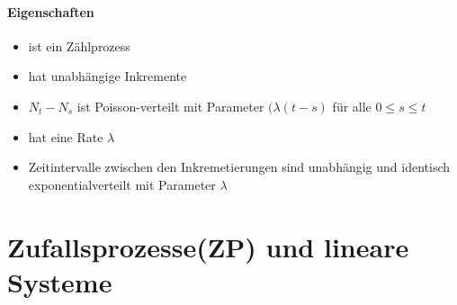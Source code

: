 \documentclass[6pt,a4paper]{scrartcl}
\begin{document}
\begin{multicols*}{4}
{	\paragraph{Eigenschaften}
	\begin{itemize}
		\item ist ein Zählprozess
		\item hat unabhängige Inkremente
		\item $N_t - N_s$ ist Poisson-verteilt mit Parameter $(\lambda(t-s)$ für alle $0 \le s \le t$
		\item hat eine Rate $\lambda$
		\item Zeitintervalle zwischen den Inkremetierungen sind unabhängig und identisch exponentialverteilt mit Parameter $\lambda$

	\end{itemize}

}

\section{Zufallsprozesse(ZP) und lineare Systeme}
\end{multicols*}
\end{document}
